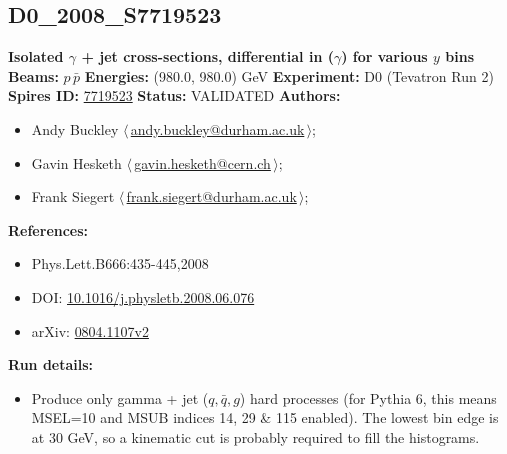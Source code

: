\subsection[D0\_2008\_S7719523]{D0\_2008\_S7719523\,\cite{Abazov:2008er}}
\textbf{Isolated $\gamma$ + jet cross-sections, differential in \pT($\gamma$) for various $y$ bins}\newline
\textbf{Beams:} $p$\,$\bar{p}$ \newline
\textbf{Energies:} (980.0, 980.0) GeV \newline
\textbf{Experiment:} D0 (Tevatron Run 2) \newline
\textbf{Spires ID:} \href{http://www.slac.stanford.edu/spires/find/hep/www?rawcmd=key+7719523}{7719523}\newline
\textbf{Status:} VALIDATED\newline
\textbf{Authors:}
\begin{itemize}
  \item Andy Buckley $\langle\,$\href{mailto:andy.buckley@durham.ac.uk}{andy.buckley@durham.ac.uk}$\,\rangle$;
  \item Gavin Hesketh $\langle\,$\href{mailto:gavin.hesketh@cern.ch}{gavin.hesketh@cern.ch}$\,\rangle$;
  \item Frank Siegert $\langle\,$\href{mailto:frank.siegert@durham.ac.uk}{frank.siegert@durham.ac.uk}$\,\rangle$;
\end{itemize}
\textbf{References:}
\begin{itemize}
  \item Phys.Lett.B666:435-445,2008
  \item DOI: \href{http://dx.doi.org/10.1016/j.physletb.2008.06.076}{10.1016/j.physletb.2008.06.076}
  \item arXiv: \href{http://arxiv.org/abs/0804.1107v2}{0804.1107v2}
\end{itemize}
\textbf{Run details:}
\begin{itemize}

  \item Produce only gamma + jet ($q,\bar{q},g$) hard processes (for Pythia 6, this means MSEL=10 and MSUB indices 14, 29 \& 115 enabled). The lowest bin edge is at 30 GeV, so a kinematic \pTmin cut is probably required to fill the histograms.\end{itemize}

